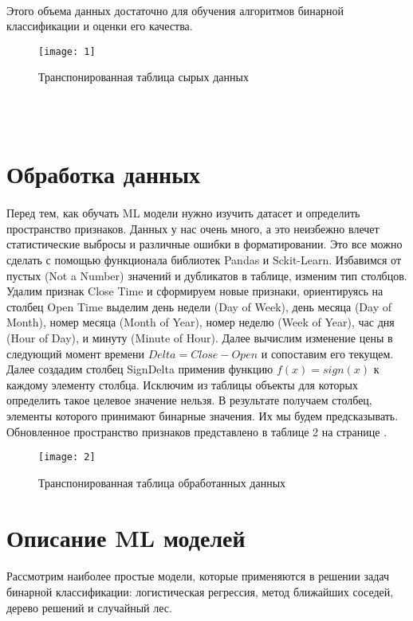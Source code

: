\documentclass{article}
\begin{document}
	\paragraph{}
	Этого объема данных достаточно для обучения  алгоритмов бинарной классификации и оценки его качества. 
	\begin{figure}
		\label{raw}
		\texttt{[image: 1]}
		\caption{Транспонированная таблица сырых данных}
	\end{figure}
	\\
	\\
	\section{Обработка данных}
	\paragraph{}
	Перед тем, как обучать ML модели нужно  изучить датасет и определить пространство признаков. Данных у нас очень много, а это неизбежно влечет статистические выбросы и различные ошибки в форматировании. Это все можно сделать с помощью функционала библиотек Pandas и Sckit-Learn. Избавимся от пустых (Not a Number) значений и дубликатов в таблице, изменим тип столбцов. Удалим признак Close Time и сформируем новые признаки, ориентируясь на столбец Open Time выделим день недели (Day of Week), день месяца (Day of Month), номер месяца (Month of Year), номер неделю (Week of Year), час дня (Hour of Day), и минуту (Minute of Hour). Далее вычислим изменение цены в следующий момент времени $Delta = Close - Open$ и сопоставим его текущем. Далее создадим столбец SignDelta применив функцию $f(x) = sign(x)$ к каждому элементу столбца. Исключим из таблицы объекты для которых определить такое целевое значение нельзя. В результате получаем столбец,  элементы которого принимают бинарные значения. Их мы будем предсказывать. Обновленное пространство признаков представлено в таблице 2 на странице \pageref{new}. 
	\\
	\begin{figure}
		\label{new}
		\texttt{[image: 2]}
		\caption{Транспонированная таблица обработанных данных}
	\end{figure}
	\section{Описание ML моделей}
	\paragraph{}
	Рассмотрим наиболее простые модели, которые применяются в решении задач бинарной классификации: логистическая регрессия, метод ближайших соседей, дерево решений и случайный лес.
\end{document}
